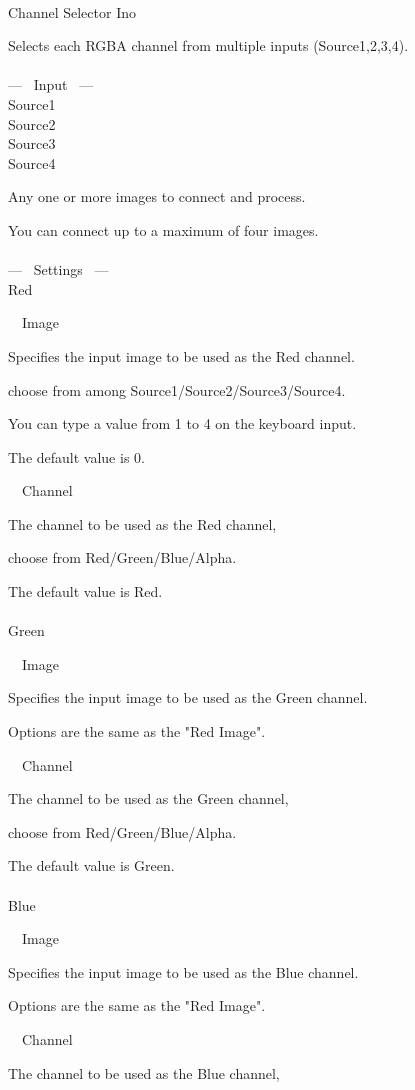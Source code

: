 \documentclass[a4paper,12pt]{article}
\begin{document}
\thispagestyle{empty}

\Large
\noindent \\
Channel Selector Ino\medskip
\par
\normalsize
Selects each RGBA channel from multiple inputs (Source1,2,3,4).\\
\\
--- \ Input \ ---\\
Source1\\
Source2\\
Source3\\
Source4\par
Any one or more images to connect and process.\par
You can connect up to a maximum of four images.\\
\\
--- \ Settings \ ---\\
Red\par
\noindent \ \, Image\par
Specifies the input image to be used as the Red channel.\par
choose from among Source1/Source2/Source3/Source4.\par
You can type a value from 1 to 4 on the keyboard input.\par
The default value is 0.\\
\par
\noindent \ \, Channel\par
The channel to be used as the Red channel,\par
choose from Red/Green/Blue/Alpha.\par
The default value is Red.\\
\\
Green\par
\noindent \ \, Image\par
Specifies the input image to be used as the Green channel.\par
Options are the same as the "Red Image".\\
\par
\noindent \ \, Channel\par
The channel to be used as the Green channel,\par
choose from Red/Green/Blue/Alpha.\par
The default value is Green.\\
\\
Blue\par
\noindent \ \, Image\par
Specifies the input image to be used as the Blue channel.\par
Options are the same as the "Red Image".\\
\par
\noindent \ \, Channel\par
The channel to be used as the Blue channel,
\end{document}
